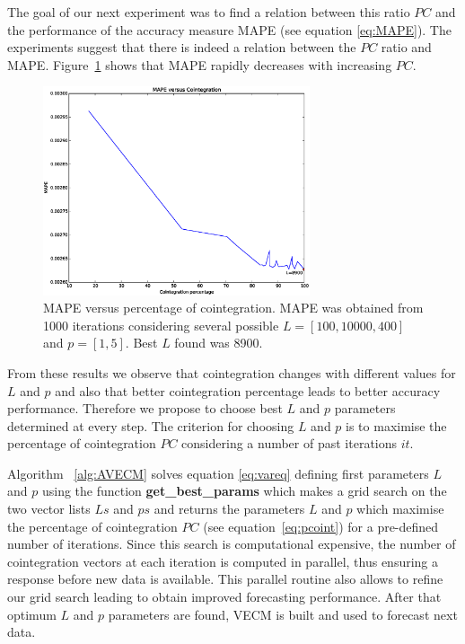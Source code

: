 The goal of our next experiment was to find a relation between this ratio
$PC$ and the performance of the accuracy measure MAPE (see equation 
\ref{eq:MAPE}). 
The experiments suggest that there is indeed a relation between the $PC$ ratio
and MAPE.
Figure~\ref{fig:cointvsmape} shows that MAPE rapidly decreases with increasing
$PC$.

\begin{figure}[!h]
  \centering
  \includegraphics[width=0.7\textwidth]{img/MAPEvsCoint-offset21600-p-2-freq-10s}
  \caption{MAPE versus percentage of cointegration. MAPE was obtained from 1000
  iterations considering several possible $L=[100,10000,400]$ and $p=[1,5]$.
  Best $L$ found was 8900.}
  \label{fig:cointvsmape}
\end{figure}

From these results we observe that cointegration changes with different values
for $L$ and $p$ and also that better cointegration percentage leads to better
accuracy performance.  Therefore we propose to choose best $L$ and $p$
parameters determined at every step.  The criterion for choosing $L$ and $p$ is
to maximise the percentage of cointegration $PC$ considering a number of past
iterations $it$.



Algorithm ~\ref{alg:AVECM} solves equation \ref{eq:vareq} defining first
parameters $L$ and $p$ using the function {\bf get\_best\_params} which makes a
grid search on the two vector lists $Ls$ and $ps$ and returns the parameters $L$
and $p$ which maximise the percentage of cointegration $PC$ (see
equation~\ref{eq:pcoint}) for a pre-defined number of iterations.  Since this
search is computational expensive, the number of cointegration vectors at each
iteration is computed in parallel, thus ensuring a response before new data is
available.  This parallel routine also allows to refine our grid search leading
to obtain improved forecasting performance.  After that optimum $L$ and $p$
parameters are found, VECM is built and used to forecast next data.

